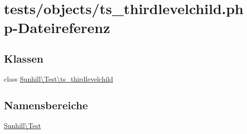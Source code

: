 \hypertarget{ts__thirdlevelchild_8php}{}\section{tests/objects/ts\+\_\+thirdlevelchild.php-\/\+Dateireferenz}
\label{ts__thirdlevelchild_8php}
\subsection*{Klassen}
\begin{DoxyCompactItemize}
\item 
class \hyperlink{classSunhill_1_1Test_1_1ts__thirdlevelchild}{Sunhill\textbackslash{}\+Test\textbackslash{}ts\+\_\+thirdlevelchild}
\end{DoxyCompactItemize}
\subsection*{Namensbereiche}
\begin{DoxyCompactItemize}
\item 
 \hyperlink{namespaceSunhill_1_1Test}{Sunhill\textbackslash{}\+Test}
\end{DoxyCompactItemize}
